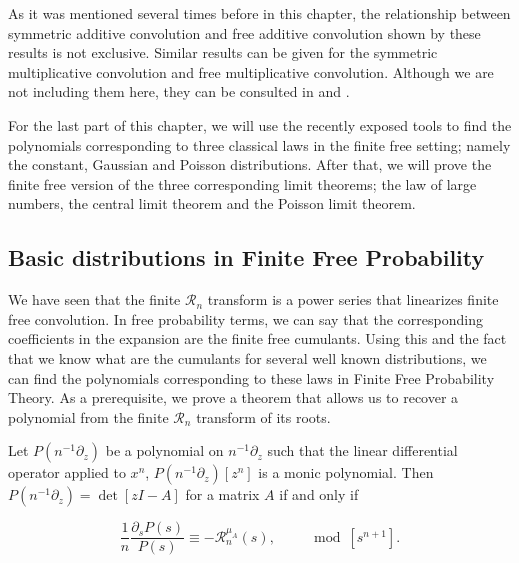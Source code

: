 As it was mentioned several times before in this chapter, the relationship between symmetric additive convolution and free additive convolution shown by these results is not exclusive. Similar results can be given for the symmetric multiplicative convolution and free multiplicative convolution. Although we are not including them here, they can be consulted in \cite{marcus2021polynomial} and \cite{article:finitefree}.

For the last part of this chapter, we will use the recently exposed tools to find the polynomials corresponding to three classical laws in the finite free setting; namely the constant, Gaussian and Poisson distributions. After that, we will prove the finite free version of the three corresponding limit theorems; the law of large numbers, the central limit theorem and the Poisson limit theorem.

\subsection{Basic distributions in Finite Free Probability}

We have seen that the finite $\mathcal R_n$ transform is a power series that linearizes finite free convolution. In free probability terms, we can say that the corresponding coefficients in the expansion are the finite free cumulants. Using this and the fact that we know what are the cumulants for several well known distributions, we can find the polynomials corresponding to these laws in Finite Free Probability Theory. As a prerequisite, we prove a theorem that allows us to recover a polynomial from the finite $\mathcal R_n$ transform of its roots.

\begin{theorem} \label{thm:if_and_only_if}
    Let $P(n^{-1}\partial_z)$ be a polynomial on $n^{-1}\partial_z$ such that the linear differential operator applied to $x^n$, $P(n^{-1}\partial_z)[z^n]$ is a monic polynomial. Then $P(n^{-1}\partial_z) = \det[zI - A]$ for a matrix $A$ if and only if 

    \begin{equation} \label{eq:cauchy_transform_R}
        \frac1n \frac{\partial_s P(s)}{P(s)} \equiv - \mathcal R_n^{\mu_A}(s), \qquad \mod [s^{n+1}].
    \end{equation}
\end{theorem}

